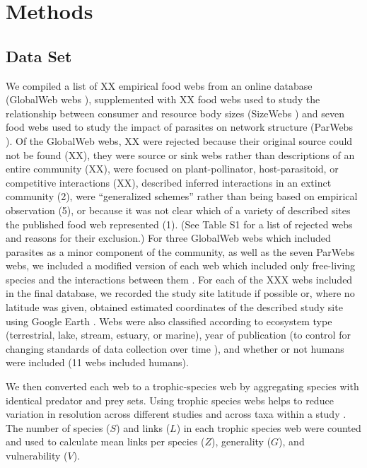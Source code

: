 \documentclass[12pt]{article}
\begin{document}
\section*{Methods}

\subsection*{Data Set}
We compiled a list of XX empirical food webs from an online database (GlobalWeb webs \citep{GlobalWeb}), supplemented 
with XX food webs used to study the relationship between consumer and resource body sizes (SizeWebs \citep{Brose2006})
and seven food webs used to study the impact of parasites on network structure (ParWebs \citep{Dunne2013}).
Of the GlobalWeb webs, XX were rejected because their original source could not be found (XX), they were source or sink
webs rather than descriptions of an entire community (XX), were focused on plant-pollinator, host-parasitoid, or 
competitive interactions (XX), described inferred interactions in an extinct community (2), were ``generalized 
schemes'' rather than being based on empirical observation (5), or because it was not clear which of a variety of 
described sites the published food web represented (1). (See Table S1 for a list of rejected webs and reasons for their
exclusion.) For three GlobalWeb webs which included parasites as a minor component of the community, as well as the 
seven ParWebs webs, we included a modified version of each web which included only free-living species and the 
interactions between them \citep{Dunne2013}. For each of the XXX webs included in the final database, we recorded the
study site latitude if possible or, where no latitude was given, obtained estimated coordinates of the described
study site using Google Earth \citep{GoogleEarth}. Webs were also classified according to ecosystem type (terrestrial,
lake, stream, estuary, or marine), year of publication (to control for changing standards of data collection over time \citep{Dunne2006}), and whether or not humans were included (11 webs included humans).


We then converted each web to a trophic-species web by aggregating species with identical predator and prey sets.
Using trophic species webs helps to reduce variation in resolution across different studies and across taxa within
a study \citep{Martinez1991,Vermaat2009,Dunne2004,Dunne2013}. The number of species ($S$) and links ($L$) in each 
trophic species
web were counted and used to calculate mean links per species ($Z$), generality ($G$), and vulnerability ($V$).
\end{document}
